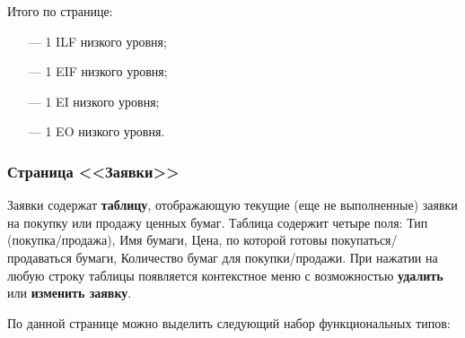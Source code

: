 Итого по странице:

\begin{itemize}
    \item[---] 1 ILF низкого уровня;
    \item[---] 1 EIF низкого уровня;
    \item[---] 1 EI низкого уровня;
    \item[---] 1 EO низкого уровня.
\end{itemize}

\subsubsection*{Страница <<Заявки>>}

Заявки содержат \textbf{таблицу}, отображающую текущие (еще не выполненные) заявки на покупку или продажу ценных бумаг. Таблица содержит четыре поля: Тип (покупка/продажа), Имя бумаги, Цена, по которой готовы покупаться/продаваться бумаги, Количество бумаг для покупки/продажи. При нажатии на любую строку таблицы появляется контекстное меню с возможностью \textbf{удалить} или \textbf{изменить заявку}.

По данной странице можно выделить следующий набор функциональных типов:

